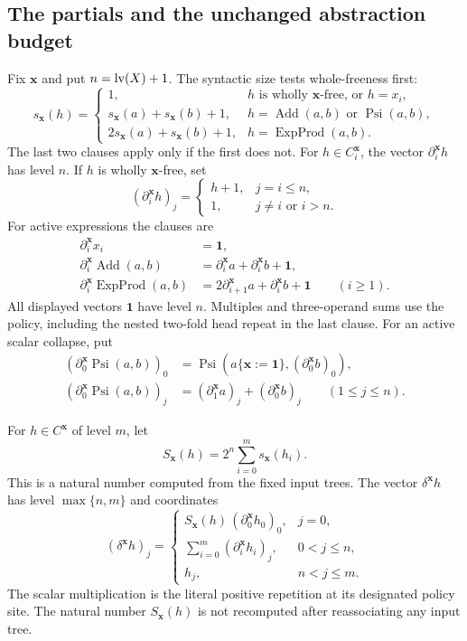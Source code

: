 \subsection{The partials and the unchanged abstraction budget}

Fix $\mathbf x$ and put $n=\operatorname{lv}(X)+1$.  The syntactic size tests
whole-freeness first:
\[
 s_{\mathbf x}(h)=
 \begin{cases}
 1,&h\text{ is wholly }\mathbf x\text{-free, or }h=x_i,\\
 s_{\mathbf x}(a)+s_{\mathbf x}(b)+1,
    &h=\operatorname{Add}(a,b)\text{ or }\operatorname{Psi}(a,b),\\
 2s_{\mathbf x}(a)+s_{\mathbf x}(b)+1,
    &h=\operatorname{ExpProd}(a,b).
 \end{cases}
\]
The last two clauses apply only if the first does not.
For $h\in C_i^{\mathbf x}$, the vector $\partial_i^{\mathbf x}h$
has level $n$.  If $h$ is wholly $\mathbf x$-free, set
\[
 (\partial_i^{\mathbf x}h)_j=
 \begin{cases}h+1,&j=i\le n,\\1,&j\ne i\text{ or }i>n.
 \end{cases}
\]
For active expressions the clauses are
\begin{align*}
 \partial_i^{\mathbf x}x_i&=\mathbf1,\\
 \partial_i^{\mathbf x}\operatorname{Add}(a,b)
   &=\partial_i^{\mathbf x}a+\partial_i^{\mathbf x}b+\mathbf1,\\
 \partial_i^{\mathbf x}\operatorname{ExpProd}(a,b)
   &=2\partial_{i+1}^{\mathbf x}a+\partial_i^{\mathbf x}b+\mathbf1
       \qquad(i\ge1).
\end{align*}
All displayed vectors $\mathbf1$ have level $n$.  Multiples and
three-operand sums use the policy, including the nested two-fold head
repeat in the last clause.  For an active scalar collapse, put
\begin{align*}
 (\partial_0^{\mathbf x}\operatorname{Psi}(a,b))_0
   &=\operatorname{Psi}(a\{\mathbf x:=\mathbf1\},
                              (\partial_0^{\mathbf x}b)_0),\\
 (\partial_0^{\mathbf x}\operatorname{Psi}(a,b))_j
   &=(\partial_1^{\mathbf x}a)_j+(\partial_0^{\mathbf x}b)_j
                                      \qquad(1\le j\le n).
\end{align*}

For $h\in C^{\mathbf x}$ of level $m$, let
\[
 S_{\mathbf x}(h)=2^n\sum_{i=0}^m s_{\mathbf x}(h_i).
\]
This is a natural number computed from the fixed input trees.
The vector $\delta^{\mathbf x}h$ has level $\max\{n,m\}$ and
coordinates
\begin{equation}\label{eq:source-delta}
 (\delta^{\mathbf x}h)_j=
 \begin{cases}
 S_{\mathbf x}(h)\,(\partial_0^{\mathbf x}h_0)_0,&j=0,\\
 \displaystyle\sum_{i=0}^m(\partial_i^{\mathbf x}h_i)_j,&0<j\le n,\\
 h_j,&n<j\le m.
 \end{cases}
\end{equation}
The scalar multiplication is the literal positive repetition at its
designated policy site.  The natural number $S_{\mathbf x}(h)$ is
not recomputed after reassociating any input tree.

